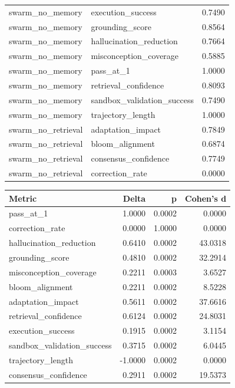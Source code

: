 \begin{tabular}{llr}
swarm_no_memory & execution\_success & 0.7490 \\
swarm_no_memory & grounding\_score & 0.8564 \\
swarm_no_memory & hallucination\_reduction & 0.7664 \\
swarm_no_memory & misconception\_coverage & 0.5885 \\
swarm_no_memory & pass\_at\_1 & 1.0000 \\
swarm_no_memory & retrieval\_confidence & 0.8093 \\
swarm_no_memory & sandbox\_validation\_success & 0.7490 \\
swarm_no_memory & trajectory\_length & 1.0000 \\
swarm_no_retrieval & adaptation\_impact & 0.7849 \\
swarm_no_retrieval & bloom\_alignment & 0.6874 \\
swarm_no_retrieval & consensus\_confidence & 0.7749 \\
swarm_no_retrieval & correction\_rate & 0.0000 \\
\bottomrule
\end{tabular}

\begin{tabular}{lrrr}
\toprule
Metric & Delta & p & Cohen's d \\
\midrule
pass\_at\_1 & 1.0000 & 0.0002 & 0.0000 \\
correction\_rate & 0.0000 & 1.0000 & 0.0000 \\
hallucination\_reduction & 0.6410 & 0.0002 & 43.0318 \\
grounding\_score & 0.4810 & 0.0002 & 32.2914 \\
misconception\_coverage & 0.2211 & 0.0003 & 3.6527 \\
bloom\_alignment & 0.2211 & 0.0002 & 8.5228 \\
adaptation\_impact & 0.5611 & 0.0002 & 37.6616 \\
retrieval\_confidence & 0.6124 & 0.0002 & 24.8031 \\
execution\_success & 0.1915 & 0.0002 & 3.1154 \\
sandbox\_validation\_success & 0.3715 & 0.0002 & 6.0445 \\
trajectory\_length & -1.0000 & 0.0002 & 0.0000 \\
consensus\_confidence & 0.2911 & 0.0002 & 19.5373 \\
\bottomrule
\end{tabular}
